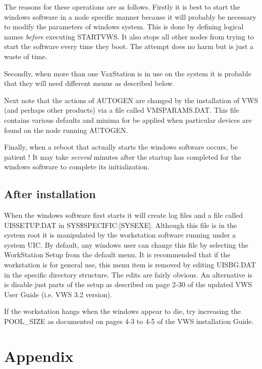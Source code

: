 The reasons for these operations are as follows.
Firstly it is best to start the windows software in a node specific manner
because it will probably be necessary to modify the parameters of windows
system.
This is done by defining logical names {\em before} executing STARTVWS.
It also stops all other nodes from trying to start the software every time
they boot. The attempt does no harm but is just a waste of time.

Secondly, when more than one VaxStation is in use on the system it is probable
that they will need different menus as described below.

Next note that the actions of AUTOGEN are changed by the installation of
VWS (and perhaps other products) via a file called VMSPARAMS.DAT.
This file contains various defaults and minima for be applied when particular
devices are found on the node running AUTOGEN.

Finally, when a reboot that actually starts the windows software occurs, be
patient ! It may take {\em several} minutes after the startup has completed
for the windows software to complete its initialization.

\subsection {After installation}

When the windows software first starts it will create log files and a file
called UISSETUP.DAT in SYS\$SPECIFIC:[SYSEXE].
Although this file is in the system root it is manipulated by the workstation
software running under a system UIC.
By default, any windows user can change this file by selecting the WorkStation
Setup from the default menu.
It is recommended that if the workstation is for general use, this menu item
is removed by editing UISBG.DAT in the specific directory structure.
The edits are fairly obvious.
An alternative is is disable just parts of the setup as described on page
2-30 of the updated VWS User Guide (i.e. VWS 3.2 version).

If the workstation hangs when the windows appear to die,
try increasing the POOL\_SIZE as documented on pages 4-3 to 4-5 of the
VWS installation Guide.

\appendix

\section {Appendix}

